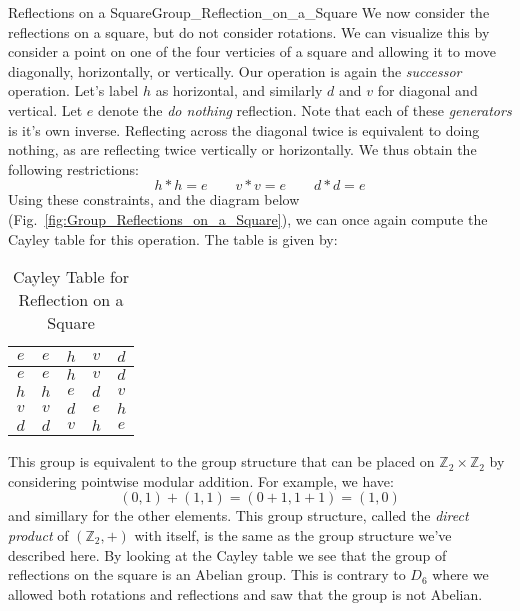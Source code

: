     \begin{lexample}{Reflections on a Square}{Group_Reflection_on_a_Square}
        We now consider the reflections on a square, but do not consider
        rotations. We can visualize this by consider a point on one of the
        four verticies of a square and allowing it to move diagonally,
        horizontally, or vertically. Our operation is again the
        \textit{successor} operation. Let's label $h$ as horizontal, and
        similarly $d$ and $v$ for diagonal and vertical. Let $e$ denote the
        \textit{do nothing} reflection. Note that each of these
        \textit{generators} is it's own inverse. Reflecting across the
        diagonal twice is equivalent to doing nothing, as are reflecting twice
        vertically or horizontally. We thus obtain the following restrictions:
        \begin{equation}
            h*h=e
            \quad\quad
            v*v=e
            \quad\quad
            d*d=e
        \end{equation}
        Using these constraints, and the diagram below
        (Fig.~\ref{fig:Group_Reflections_on_a_Square}), we can once again
        compute the Cayley table for this operation. The table is given by:
        \begin{table}[H]
            \centering
            \captionsetup{type=table}
            \begin{tabular}{c|cccc}
                $e$&$e$&$h$&$v$&$d$\\
                \hline
                $e$&$e$&$h$&$v$&$d$\\
                $h$&$h$&$e$&$d$&$v$\\
                $v$&$v$&$d$&$e$&$h$\\
                $d$&$d$&$v$&$h$&$e$
            \end{tabular}
            \caption{Cayley Table for Reflection on a Square}
            \label{tab:Cayley_Table_Reflection_on_Square}
        \end{table}
        This group is equivalent to the group structure that can be placed on
        $\mathbb{Z}_{2}\times\mathbb{Z}_{2}$ by considering pointwise modular
        addition. For example, we have:
        \begin{equation}
            (0,1)+(1,1)=(0+1,1+1)=(1,0)
        \end{equation}
        and simillary for the other elements. This group structure, called the
        \textit{direct product} of $(\mathbb{Z}_{2},+)$ with itself, is the same
        as the group structure we've described here. By looking at the Cayley
        table we see that the group of reflections on the square is an Abelian
        group. This is contrary to $D_{6}$ where we allowed both rotations and
        reflections and saw that the group is not Abelian.
    \end{lexample}
